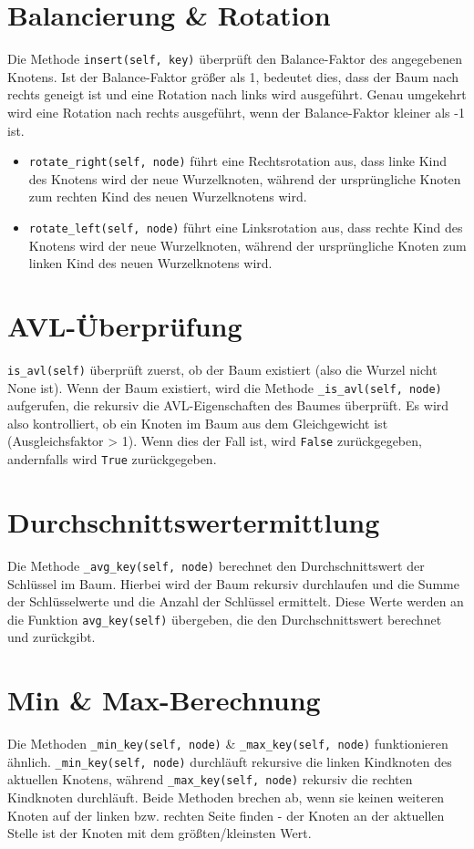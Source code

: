 \documentclass{article}
\begin{document}
\section*{Balancierung \& Rotation}
Die Methode \texttt{insert(self, key)} überprüft den Balance-Faktor des angegebenen Knotens. Ist der Balance-Faktor größer als 1, bedeutet dies, dass der Baum nach rechts geneigt ist und
eine Rotation nach links wird ausgeführt. Genau umgekehrt wird eine Rotation nach rechts ausgeführt, wenn der Balance-Faktor kleiner als -1 ist.
\begin{itemize}
    \item \texttt{rotate\_right(self, node)} führt eine Rechtsrotation aus, dass linke Kind des Knotens wird der neue Wurzelknoten, während der ursprüngliche Knoten zum rechten Kind des neuen Wurzelknotens wird.
    \item \texttt{rotate\_left(self, node)} führt eine Linksrotation aus, dass rechte Kind des Knotens wird der neue Wurzelknoten, während der ursprüngliche Knoten zum linken Kind des neuen Wurzelknotens wird.
\end{itemize}

\section*{AVL-Überprüfung}
\texttt{is\_avl(self)} überprüft zuerst, ob der Baum existiert (also die Wurzel nicht None ist). Wenn der Baum existiert, wird die Methode \texttt{\_is\_avl(self, node)} aufgerufen, die rekursiv die AVL-Eigenschaften des Baumes überprüft.
Es wird also kontrolliert, ob ein Knoten im Baum aus dem Gleichgewicht ist (Ausgleichsfaktor > 1). Wenn dies der Fall ist, wird \texttt{False} zurückgegeben, andernfalls wird \texttt{True} zurückgegeben.

\section*{Durchschnittswertermittlung}
Die Methode \texttt{\_avg\_key(self, node)} berechnet den Durchschnittswert der Schlüssel im Baum. Hierbei wird der Baum rekursiv durchlaufen und die Summe der Schlüsselwerte und die Anzahl der Schlüssel ermittelt.
Diese Werte werden an die Funktion \texttt{avg\_key(self)} übergeben, die den Durchschnittswert berechnet und zurückgibt.

\section*{Min \& Max-Berechnung}
Die Methoden \texttt{\_min\_key(self, node)} \& \texttt{\_max\_key(self, node)} funktionieren ähnlich. \texttt{\_min\_key(self, node)} durchläuft rekursive die linken Kindknoten des aktuellen Knotens, während \texttt{\_max\_key(self, node)}
rekursiv die rechten Kindknoten durchläuft. Beide Methoden brechen ab, wenn sie keinen weiteren Knoten auf der linken bzw. rechten Seite finden - der Knoten an der aktuellen Stelle ist der Knoten mit dem größten/kleinsten Wert.
\end{document}
